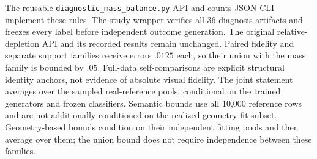 The reusable \texttt{diagnostic\_mass\_balance.py} API and counts-JSON CLI
implement these rules. The study wrapper verifies all 36 diagnosis artifacts
and freezes every label before independent outcome generation. The original
relative-depletion API and its recorded results remain unchanged. Paired
fidelity and separate support families receive errors $.0125$ each, so their
union with the mass family is bounded by $.05$. Full-data self-comparisons are
explicit structural identity anchors, not evidence of absolute visual fidelity.
The joint statement averages over the sampled real-reference pools, conditional
on the trained generators and frozen classifiers. Semantic bounds use all
10,000 reference rows and are not additionally conditioned on the realized
geometry-fit subset. Geometry-based bounds condition on their independent
fitting pools and then average over them; the union bound does not require
independence between these families.
